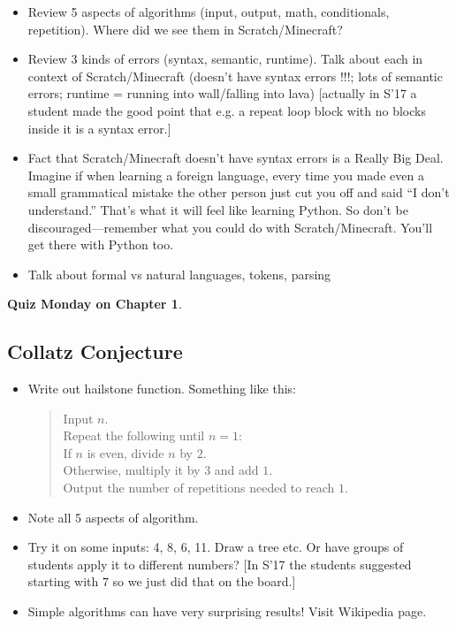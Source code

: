 \documentclass{article}
\begin{document}
\begin{itemize}
\item Review 5 aspects of algorithms (input, output, math,
  conditionals, repetition).  Where did we see them in
  Scratch/Minecraft?
\item Review 3 kinds of errors (syntax, semantic, runtime).  Talk
  about each in context of Scratch/Minecraft (doesn't have syntax
  errors !!!; lots of semantic errors; runtime = running into
  wall/falling into lava) [actually in S'17 a student made the good
  point that e.g. a repeat loop block with no blocks inside it is a
  syntax error.]
\item Fact that Scratch/Minecraft doesn't have syntax errors is a
  Really Big Deal.  Imagine if when learning a foreign language, every
  time you made even a small grammatical mistake the other person just
  cut you off and said ``I don't understand.''  That's what it will
  feel like learning Python.  So don't be discouraged---remember what
  you could do with Scratch/Minecraft.  You'll get there with Python
  too.
\item Talk about formal vs natural languages, tokens, parsing
\end{itemize}

\textbf{Quiz Monday on Chapter 1}.

\subsection*{Collatz Conjecture}

\begin{itemize}
\item Write out hailstone function. Something like this:
  \begin{quote}
    Input $n$. \\
    Repeat the following until $n = 1$: \\
    \mbox{} \quad If $n$ is even, divide $n$ by $2$. \\
    \mbox{} \quad Otherwise, multiply it by $3$ and add $1$. \\
    Output the number of repetitions needed to reach $1$.
  \end{quote}
\item Note all 5 aspects of algorithm.
\item Try it on some inputs: 4, 8, 6, 11. Draw a tree etc.  Or have
  groups of students apply it to different numbers?  [In S'17 the
  students suggested starting with $7$ so we just did that on the board.]
\item Simple algorithms can have very surprising results!  Visit
  Wikipedia page.
\end{itemize}
\end{document}
